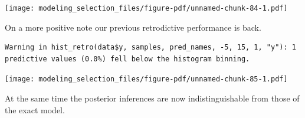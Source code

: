 \documentclass[
  letterpaper,
  DIV=11,
  numbers=noendperiod]{scrartcl}
\newenvironment{Shaded}{\begin{snugshade}}{\end{snugshade}}
\newcommand{\AttributeTok}[1]{\textcolor[rgb]{0.40,0.45,0.13}{#1}}
\newcommand{\ConstantTok}[1]{\textcolor[rgb]{0.56,0.35,0.01}{#1}}
\newcommand{\DecValTok}[1]{\textcolor[rgb]{0.68,0.00,0.00}{#1}}
\newcommand{\FunctionTok}[1]{\textcolor[rgb]{0.28,0.35,0.67}{#1}}
\newcommand{\NormalTok}[1]{\textcolor[rgb]{0.00,0.23,0.31}{#1}}
\newcommand{\OtherTok}[1]{\textcolor[rgb]{0.00,0.23,0.31}{#1}}
\newcommand{\SpecialCharTok}[1]{\textcolor[rgb]{0.37,0.37,0.37}{#1}}
\newcommand{\StringTok}[1]{\textcolor[rgb]{0.13,0.47,0.30}{#1}}
\begin{document}
\texttt{[image: modeling\_selection\_files/figure-pdf/unnamed-chunk-84-1.pdf]}

On a more positive note our previous retrodictive performance is back.

\begin{Shaded}
\end{Shaded}

\begin{verbatim}
Warning in hist_retro(data$y, samples, pred_names, -5, 15, 1, "y"): 1
predictive values (0.0%) fell below the histogram binning.
\end{verbatim}

\texttt{[image: modeling\_selection\_files/figure-pdf/unnamed-chunk-85-1.pdf]}

At the same time the posterior inferences are now indistinguishable from
those of the exact model.
\end{document}
